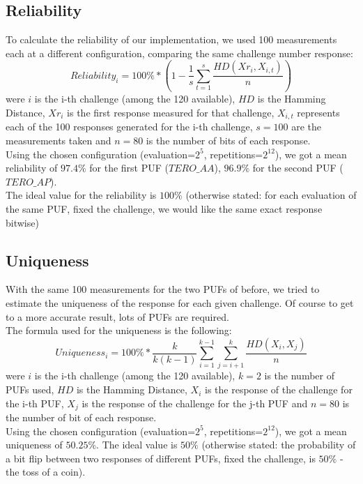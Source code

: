 \subsection{Reliability}

To calculate the reliability of our implementation, we used 100 measurements each at a different configuration,
comparing the same challenge number response:
\begin{equation}
    Reliability_i = 100\% * (1 - \frac{1}{s} \sum_{t=1}^{s} \frac{HD(Xr_i, X_{i,t})}{n})
\end{equation}
were $ i $ is the i-th challenge (among the 120 available), $ HD $ is the Hamming Distance, $ Xr_i $ is the first response measured 
for that challenge, $ X_{i,t} $ represents each of the 100 responses generated for the i-th challenge, $s=100$ are the measurements taken
and $n=80$ is the number of bits of each response. \\

Using the chosen configuration (evaluation=$ 2^5 $, repetitions=$ 2^{12} $), we got a mean reliability 
of $ 97.4\% $ for the first PUF ($TERO\_AA$), $ 96.9\% $ for the second PUF ($TERO\_AP$). \\
The ideal value for the reliability is $100\%$ (otherwise stated: for each evaluation of the same PUF, fixed the challenge, we would like the same exact response bitwise)

\subsection{Uniqueness}
With the same 100 measurements for the two PUFs of before, we tried to estimate the uniqueness of the response for each given challenge.
Of course to get to a more accurate result, lots of PUFs are required. \\
The formula used for the uniqueness is the following:
\begin{equation}
    Uniqueness_i = 100\% * \frac{k}{k(k-1)} \sum_{i=1}^{k-1}\sum_{j=i+1}^{k} \frac{HD(X_i,X_j)}{n}
\end{equation}
were $ i $ is the i-th challenge (among the 120 available), $k=2$ is the number of PUFs used, $ HD $ is the Hamming Distance, $ X_i $ is the response of the challenge 
for the i-th PUF, $ X_j $ is the response of the challenge for the j-th PUF and $n=80$ is the number of bit of each response. \\

Using the chosen configuration (evaluation=$ 2^5 $, repetitions=$ 2^{12} $), we got a mean uniqueness of $50.25\%$.
The ideal value is $50\%$ (otherwise stated: the probability of a bit flip between two responses of different PUFs, fixed the challenge, is $50\%$ - the toss of a coin).


